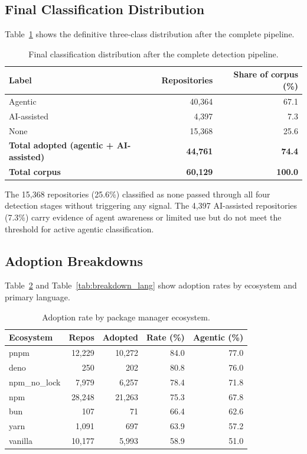 \subsection{Final Classification Distribution}

Table~\ref{tab:final_labels} shows the definitive three-class distribution after the complete pipeline.

\begin{table}[h]
\centering
\caption{Final classification distribution after the complete detection pipeline.}
\label{tab:final_labels}
\begin{tabular}{@{}lrr@{}}
\toprule
Label & Repositories & Share of corpus (\%) \\
\midrule
Agentic      & 40,364 & 67.1 \\
AI-assisted  &  4,397 &  7.3 \\
None         & 15,368 & 25.6 \\
\midrule
\textbf{Total adopted (agentic + AI-assisted)} & \textbf{44,761} & \textbf{74.4} \\
\textbf{Total corpus} & \textbf{60,129} & \textbf{100.0} \\
\bottomrule
\end{tabular}
\end{table}

The 15,368 repositories (25.6\%) classified as none passed through all four detection stages without triggering any signal. The 4,397 AI-assisted repositories (7.3\%) carry evidence of agent awareness or limited use but do not meet the threshold for active agentic classification.

\subsection{Adoption Breakdowns}

Table~\ref{tab:breakdown_eco} and Table~\ref{tab:breakdown_lang} show adoption rates by ecosystem and primary language.

\begin{table}[h]
\centering
\caption{Adoption rate by package manager ecosystem.}
\label{tab:breakdown_eco}
\begin{tabular}{@{}lrrrr@{}}
\toprule
Ecosystem & Repos & Adopted & Rate (\%) & Agentic (\%) \\
\midrule
pnpm          & 12,229 & 10,272 & 84.0 & 77.0 \\
deno          &    250 &    202 & 80.8 & 76.0 \\
npm\_no\_lock &  7,979 &  6,257 & 78.4 & 71.8 \\
npm           & 28,248 & 21,263 & 75.3 & 67.8 \\
bun           &    107 &     71 & 66.4 & 62.6 \\
yarn          &  1,091 &    697 & 63.9 & 57.2 \\
vanilla       & 10,177 &  5,993 & 58.9 & 51.0 \\
\bottomrule
\end{tabular}
\end{table}

